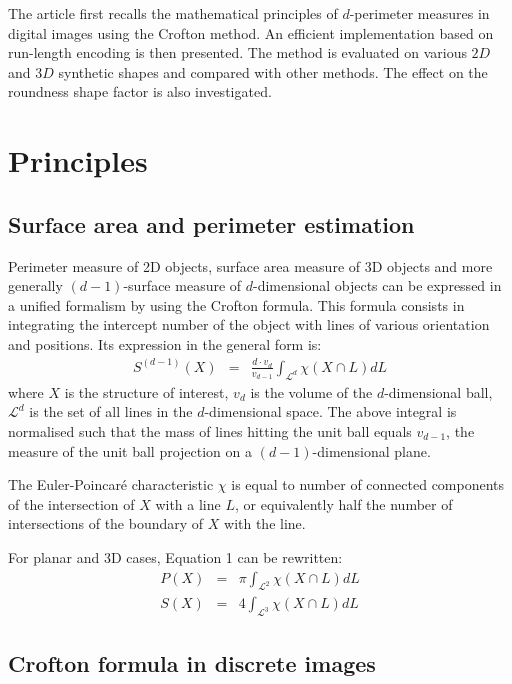 \documentclass{InsightArticle}
\begin{document}
The article first recalls the mathematical principles of $d$-perimeter measures in digital images
using the Crofton method. An efficient implementation based on run-length encoding is then presented.
The method is evaluated on various $2D$ and $3D$ synthetic shapes and compared with other methods.
The effect on the roundness shape factor is also investigated.


\section{Principles}
\subsection{Surface area and perimeter estimation}

Perimeter measure of 2D objects, surface area measure of 3D objects 
and more generally $(d-1)$-surface measure of $d$-dimensional objects 
can be expressed in a unified formalism by using the Crofton formula.
This formula consists in integrating the intercept number of the object with
lines of various orientation and positions. Its expression in
the general form is:
\begin{eqnarray}
S^{(d-1)}(X) & = & \frac{d \cdot v_d}{v_{d-1}}\int_{\mathcal{L}^d}\chi\left(X\cap L\right) dL
\end{eqnarray}
where $X$ is the structure of interest, $v_d$ is the volume of the $d$-dimensional ball,
$\mathcal{L}^d$ is the set of all lines in the $d$-dimensional space. 
The above integral is normalised such that the mass of lines hitting the unit ball 
equals $v_{d-1}$, the measure of the unit ball projection on a $(d-1)$-dimensional plane.

The Euler-Poincar\'e characteristic $\chi$ is equal to number of connected components
of the intersection of $X$ with a line $L$, or equivalently half the number of intersections
of the boundary of $X$ with the line.

For planar and 3D cases, Equation 1 can be rewritten:
\begin{eqnarray}
P(X) & = & \pi \int_{\mathcal{L}^2} \chi \left( X \cap L \right) dL \\
S(X) & = &  4  \int_{\mathcal{L}^3} \chi \left( X \cap L \right) dL
\end{eqnarray}

\subsection{Crofton formula in discrete images}
\end{document}
